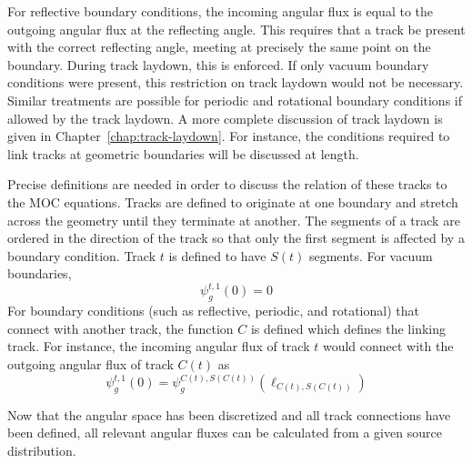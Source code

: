 For reflective boundary conditions, the incoming angular flux is equal to the outgoing angular flux at the reflecting angle. This requires that a track be present with the correct reflecting angle, meeting at precisely the same point on the boundary. During track laydown, this is enforced. If only vacuum boundary conditions were present, this restriction on track laydown would not be necessary. Similar treatments are possible for periodic and rotational boundary conditions if allowed by the track laydown.  A more complete discussion of track laydown is given in Chapter~\ref{chap:track-laydown}. For instance, the conditions required to link tracks at geometric boundaries will be discussed at length.

Precise definitions are needed in order to discuss the relation of these tracks to the MOC equations. Tracks are defined to originate at one boundary and stretch across the geometry until they terminate at another. The segments of a track are ordered in the direction of the track so that only the first segment is affected by a boundary condition. Track $t$ is defined to have $S(t)$ segments. For vacuum boundaries,
\begin{dmath}
	\psi_g^{t,1}(0) = 0
\end{dmath}
For boundary conditions (such as reflective, periodic, and rotational) that connect with another track, the function $C$ is defined which defines the linking track. For instance, the incoming angular flux of track $t$ would connect with the outgoing angular flux of track $C(t)$ as
\begin{dmath}
	\psi_g^{t,1}(0) = \psi_g^{C(t),S(C(t))}(\ell_{C(t),S(C(t))})
	\label{eqn:linking-bc}
\end{dmath}

Now that the angular space has been discretized and all track connections have been defined, all relevant angular fluxes can be calculated from a given source distribution.

